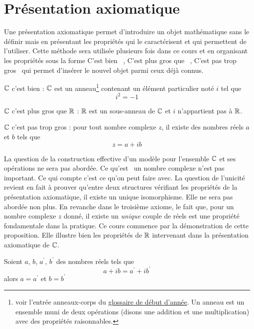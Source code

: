 \section{Présentation axiomatique }
Une présentation axiomatique permet d'introduire un objet mathématique sans le définir mais en présentant les propriétés qui le caractérisent et qui permettent de l'utiliser. Cette méthode sera utilisée plusieurs fois dans ce cours et en organisant les propriétés sous la forme \og C'est bien \fg~, \og C'est plus gros que \fg~, \og C'est pas trop gros\fg~ qui permet d'insérer le nouvel objet parmi ceux déjà connus.  
\begin{pa}
 \item[$\mathbb{C}$ c'est bien] : $\mathbb{C}$ est un anneau\footnote{voir l'entrée anneaux-corps du \href{\baseurl C4199.pdf}{glossaire de début d'année}. Un anneau est un ensemble muni de deux opérations (disons une addition et une multiplication) avec des propriétés raisonnables.} contenant un élément particulier noté $i$ tel que 
\begin{displaymath}
 i^2 = -1
\end{displaymath}
\item[$\mathbb{C}$ c'est plus gros que $\mathbb{R}$] : $\mathbb{R}$ est un sous-anneau de  $\mathbb{C}$  et $i$ n'appartient pas à $\mathbb{R}$.
\item[$\mathbb{C}$ c'est pas trop gros] : pour tout nombre complexe $z$, il existe des nombres réels $a$ et $b$ tels que 
\begin{displaymath}
 z = a + i b
\end{displaymath}
\end{pa}
La question de la construction effective d'un modèle pour l'ensemble $\mathbb{C}$ et ses opérations ne sera pas abordée. Ce qu'\og est\fg~  un nombre complexe n'est pas important. Ce qui compte c'est ce qu'on peut faire avec.
La question de l'\og unicité\fg~  revient en fait à prouver qu'entre deux structures vérifiant les propriétés de la présentation axiomatique, il existe un unique isomorphisme. Elle ne sera pas abordée non plus.\newline
En revanche dans le troisième axiome, le fait que, pour un nombre complexe $z$ donné, il existe un \emph{unique} couple de réels est une propriété fondamentale dans la pratique. Ce cours commence par la démonstration de cette proposition. Elle illustre bien les propriétés de $\mathbb{R}$ intervenant dans la présentation axiomatique de $\mathbb{C}$.
\begin{prop}
 Soient $a$, $b$, $a^\prime$, $b^\prime$ des nombres réels tels que 
\begin{displaymath}
 a + ib = a^\prime + i b^\prime
\end{displaymath}
alors $a=a^\prime$ et $b=b^\prime$
\end{prop}
